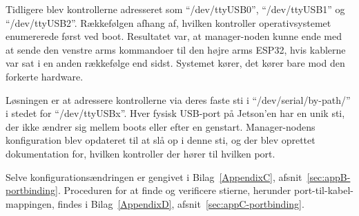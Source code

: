 Tidligere blev kontrollerne adresseret som \enquote{/dev/ttyUSB0},
\enquote{/dev/ttyUSB1} og \enquote{/dev/ttyUSB2}. Rækkefølgen afhang
af, hvilken kontroller operativsystemet enumererede først ved boot.
Resultatet var, at manager-noden kunne ende med at sende den venstre
arms kommandoer til den højre arms ESP32, hvis kablerne var sat i
en anden rækkefølge end sidst. Systemet kører, det kører bare mod
den forkerte hardware.

Løsningen er at adressere kontrollerne via deres faste sti i
\enquote{/dev/serial/by-path/} i stedet for \enquote{/dev/ttyUSBx}.
Hver fysisk USB-port på Jetson'en har en unik sti, der ikke ændrer
sig mellem boots eller efter en genstart. Manager-nodens konfiguration
blev opdateret til at slå op i denne sti, og der blev oprettet
dokumentation for, hvilken kontroller der hører til hvilken port.

Selve konfigurationsændringen er gengivet i Bilag~\ref{AppendixC},
afsnit~\ref{sec:appB-portbinding}. Proceduren for at finde og
verificere stierne, herunder port-til-kabel-mappingen,
findes i Bilag~\ref{AppendixD}, afsnit~\ref{sec:appC-portbinding}.

